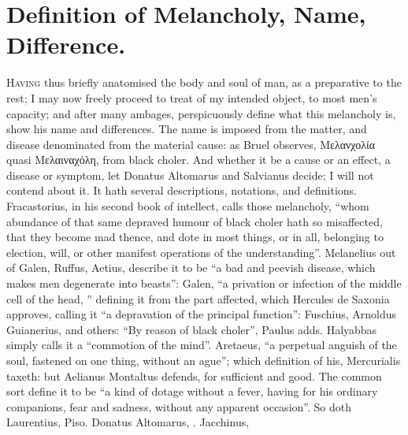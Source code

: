 \section{Definition of Melancholy, Name, Difference.}\label{sec:definition}
\lettrine{H}{aving} thus briefly anatomised the body and soul of man, as a
preparative to the rest; I may now freely proceed to treat of my intended
object, to most men's capacity; and after many ambages, perspicuously define
what this melancholy is, show his name and differences. The name is imposed
from the matter, and disease denominated from the material cause: as Bruel
observes, \textgreek{Μελανχολία} quasi \textgreek{Μελαιναχόλη}, from black
choler. And whether it be a cause or an effect, a disease or symptom, let
Donatus Altomarus and Salvianus decide; I will not contend about it. It hath
several descriptions, notations, and definitions.
Fracastorius, in his second book of intellect, calls those
melancholy, \enquote{whom abundance of that same depraved humour of black choler hath
so misaffected, that they become mad thence, and dote in most things, or in
all, belonging to election, will, or other manifest operations of the
understanding}. Melanelius out of Galen, Ruffus, Aetius,
describe it to be \enquote{a bad and peevish disease, which makes men degenerate into
beasts}: Galen, \enquote{a privation or infection of the middle cell of the head,
\etc{}} defining it from the part affected, which Hercules
de Saxonia approves,  calling it \enquote{a
depravation of the principal function}: Fuschius,  Arnoldus 
Guianerius, and others: \enquote{By reason of black choler}, Paulus adds. Halyabbas
simply calls it a \enquote{commotion of the mind}. Aretaeus, \enquote{a
perpetual anguish of the soul, fastened on one thing, without an ague}; which
definition of his, Mercurialis  taxeth: but Aelianus Montaltus defends,  for sufficient and good. The common sort define it to
be \enquote{a kind of dotage without a fever, having for his ordinary companions, fear
and sadness, without any apparent occasion}. So doth Laurentius,
 Piso. 
Donatus Altomarus, . Jacchinus,
